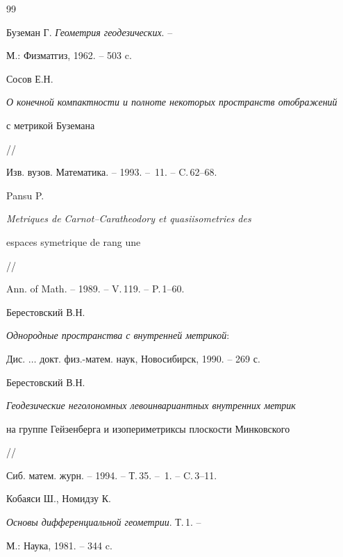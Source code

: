 \begin{thebibliography}{99}







Буземан Г.  {\em Геометрия геодезических}. --


 М.: Физматгиз, 1962. -- 503 c.







Сосов Е.Н.


 {\em О конечной компактности и полноте некоторых пространств отображений


с метрикой Буземана} //


 Изв. вузов. Математика. -- 1993. -- \No\,11. -- C.\,62--68.







Pansu P.


 {\em Metriques de Carnot--Caratheodory et quasiisometries des


espaces symetrique de rang une} //


 Ann. of Math. -- 1989. -- V.\,119. -- P.\,1--60.







Берестовский В.Н.


 {\em Однородные пространства с внутренней метрикой}:


Дис. $\dotsc$ докт. физ.-матем. наук, Новосибирск, 1990. -- 269 с.







Берестовский В.Н.


 {\em Геодезические неголономных левоинвариантных внутренних метрик


на группе Гейзенберга и изопериметриксы плоскости Минковского} //


 Сиб. матем. журн. -- 1994. -- Т.\,35. -- \No\,1. -- C.\,3--11.







Кобаяси Ш., Номидзу К.


 {\em Основы дифференциальной геометрии}. Т.\,1. --


 М.: Наука, 1981. -- 344 c.






\end{thebibliography}
